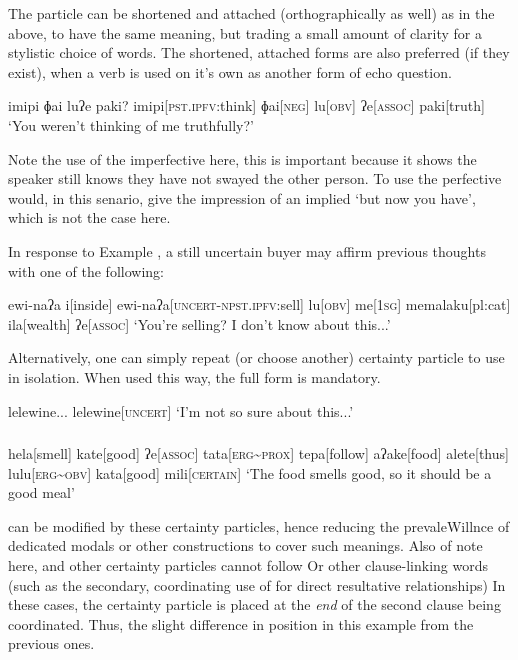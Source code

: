 The particle  can be shortened and attached (orthographically as well) as in the above, to have the same meaning, but trading a small amount of clarity for a stylistic choice of words.
The shortened, attached forms are also preferred (if they exist), when a verb is used on it's own as another form of echo question.


\ex
\begingl
\glpreamble imipi ɸai luʔe paki?
\endpreamble
imipi[\textsc{pst.ipfv}:think]
ɸai[\textsc{neg}]
lu[\textsc{obv}]
ʔe[\textsc{assoc}]
paki[truth]
\glft `You weren't thinking of me truthfully?'
\endgl
\xe

Note the use of the imperfective here, this is important because it shows the speaker still knows they have not swayed the other person.
To use the perfective would, in this senario, give the impression of an implied `but now you have', which is not the case here.

In response to Example , a still uncertain buyer may affirm previous thoughts with one of the following:

\ex
\begingl
\glpreamble ewi-naʔa
\endpreamble
i[inside]
ewi-naʔa[\textsc{uncert-npst.ipfv:}sell]
lu[\textsc{obv}]
me[\textsc{1sg}]
memalaku[pl:cat]
ila[wealth]
ʔe[\textsc{assoc}]
\glft `You're selling? I don't know about this...'
\endgl
\xe

Alternatively, one can simply repeat (or choose another) certainty particle to use in isolation.
When used this way, the full form is mandatory.

\ex
\begingl
\glpreamble lelewine...
\endpreamble
lelewine[\textsc{uncert}]
\glft `I'm not so sure about this...'
\endgl
\xe
\subsubsection{}

\ex
\begingl
\glpreamble
\pronounced{}\endpreamble
\nogloss{\lbrack}
hela[smell]
kate[good]
ʔe[\textsc{assoc}]
tata[\textsc{erg\textasciitilde prox}]
tepa[follow]
aʔake[food]
\nogloss{\rbrack}
alete[thus]
lulu[\textsc{erg\textasciitilde obv}]
kata[good]
mili[\textsc{certain}]
\glft `The food smells good, so it should be a good meal'
\endgl
\xe

 can be modified by these certainty particles, hence reducing the prevaleWillnce of dedicated modals or other constructions to cover such meanings.
Also of note here,  and other certainty particles cannot follow  Or other clause-linking words (such as the secondary, coordinating use of  for direct resultative relationships)
In these cases, the certainty particle is placed at the \textit{end} of the second clause being coordinated.
Thus, the slight difference in position in this example from the previous ones.